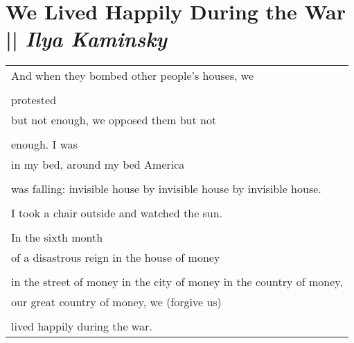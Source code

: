 \section[We Lived Happily During the War]{We Lived Happily During the War || \emph{Ilya Kaminsky} \hspace*{\fill}  \thepage}
\hspace{0pt}
\vfill
\begin{center}
\begin{tabular}{l}
And when they bombed other people’s houses, we\\
\\protested\\
but not enough, we opposed them but not\\
\\enough. I was\\
in my bed, around my bed America\\
\\was falling: invisible house by invisible house by invisible house.\\
\\I took a chair outside and watched the sun.\\
\\In the sixth month \\
of a disastrous reign in the house of money\\
\\in the street of money in the city of money in the country of money,\\
our great country of money, we (forgive us)\\
\\lived happily during the war.
\end{tabular}
\end{center}
\vfill
\hspace{0pt}